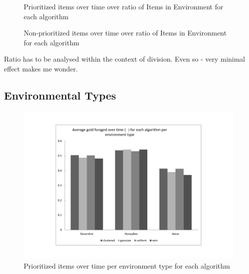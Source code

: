 
\begin{figure}[!htb]
\centering
\resizebox{\textwidth}{!}{}
\caption{Prioritized items over time over ratio of Items in Environment for each algorithm }
\label{ratiogoldplot}
\end{figure}


\begin{figure}[!htb]
\centering
\resizebox{\textwidth}{!}{}
\caption{Non-prioritized items over time over ratio of Items in Environment for each algorithm}
\label{ratiowasteplot}
\end{figure}

Ratio has to be analysed within the context of division. Even so - very minimal effect makes me wonder. 
\subsection{Environmental Types}
\label{results:environmentaltypes}



\begin{figure}[!htb]
\centering
\includegraphics[width=\textwidth]{chapters/chapter6/graphs/gold_environment.pdf}
\caption{Prioritized items over time per environment type for each algorithm}
\label{environmentgoldplot}
\end{figure}

